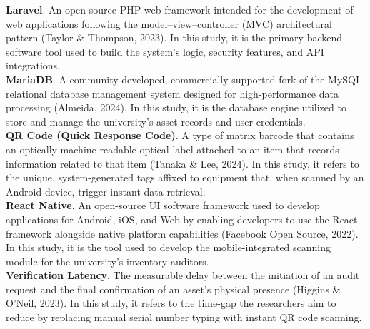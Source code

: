 {  \textbf{Laravel}. An open-source PHP web framework intended for the development of web applications following the model–view–controller (MVC) architectural pattern (Taylor \& Thompson, 2023). In this study, it is the primary backend software tool used to build the system’s logic, security features, and API integrations.\\

  \textbf{MariaDB}. A community-developed, commercially supported fork of the MySQL relational database management system designed for high-performance data processing (Almeida, 2024). In this study, it is the database engine utilized to store and manage the university’s asset records and user credentials.\\

  \textbf{QR Code (Quick Response Code)}. A type of matrix barcode that contains an optically machine-readable optical label attached to an item that records information related to that item (Tanaka \& Lee, 2024). In this study, it refers to the unique, system-generated tags affixed to equipment that, when scanned by an Android device, trigger instant data retrieval.\\

  \textbf{React Native}. An open-source UI software framework used to develop applications for Android, iOS, and Web by enabling developers to use the React framework alongside native platform capabilities (Facebook Open Source, 2022). In this study, it is the tool used to develop the mobile-integrated scanning module for the university’s inventory auditors.\\

  \textbf{Verification Latency}. The measurable delay between the initiation of an audit request and the final confirmation of an asset’s physical presence (Higgins \& O’Neil, 2023). In this study, it refers to the time-gap the researchers aim to reduce by replacing manual serial number typing with instant QR code scanning.\\
}